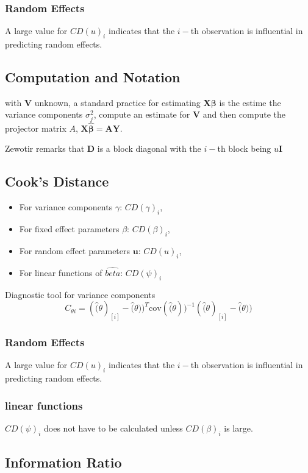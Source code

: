 \documentclass[Main.tex]{subfiles}
\begin{document}
	
	\newpage
	\subsubsection{Random Effects}
	
	A large value for $CD(u)_i$ indicates that the $i-$th observation is influential in predicting random effects.
	

	
	\newpage
	\subsection{Computation and Notation } %
	with $\boldsymbol{V}$ unknown, a standard practice for estimating $\boldsymbol{X \beta}$ is the estime the variance components $\sigma^2_j$,
	compute an estimate for $\boldsymbol{V}$ and then compute the projector matrix $A$, $\boldsymbol{X \hat{\beta}}  = \boldsymbol{AY}$.
	
	
	Zewotir remarks that $\boldsymbol{D}$ is a block diagonal with the $i-$th block being $u \boldsymbol{I}$


	

\subsection{Cook's Distance}
\begin{itemize}
	\item For variance components $\gamma$: $CD(\gamma)_i$,
	\item For fixed effect parameters $\beta$: $CD(\beta)_i$,
	\item For random effect parameters $\boldsymbol{u}$: $CD(u)_i$,
	\item For linear functions of $\hat{beta}$: $CD(\psi)_i$
\end{itemize}
	Diagnostic tool for variance components
	\[ C_{\theta i} =(\hat(\theta)_{[i]} - \hat(\theta))^{T}\mbox{cov}( \hat(\theta))^{-1}(\hat(\theta)_{[i]} - \hat(\theta))\]

\newpage
\subsubsection{Random Effects}

A large value for $CD(u)_i$ indicates that the $i-$th observation is influential in predicting random effects.

\subsubsection{linear functions}

$CD(\psi)_i$ does not have to be calculated unless $CD(\beta)_i$ is large.


\subsection{Information Ratio}




\printindex


\end{document}
